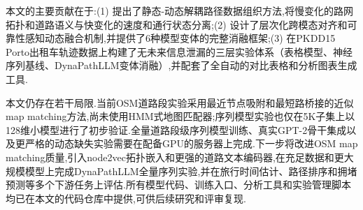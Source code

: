 \documentclass{rjthesis}
\begin{document}
本文的主要贡献在于:(1) 提出了静态-动态解耦路径数据组织方法,将慢变化的路网拓扑和道路语义与快变化的速度和通行状态分离;(2) 设计了层次化跨模态对齐和可靠性感知动态融合机制,并提供了6种模型变体的完整消融框架;(3) 在PKDD15 Porto出租车轨迹数据上构建了无未来信息泄漏的三层实验体系（表格模型、神经序列基线、DynaPathLLM变体消融）,并配套了全自动的对比表格和分析图表生成工具.

本文仍存在若干局限.当前OSM道路段实验采用最近节点吸附和最短路桥接的近似map matching方法,尚未使用HMM式地图匹配器;序列模型实验也仅在5K子集上以128维小模型进行了初步验证.全量道路段级序列模型训练、真实GPT-2骨干集成以及更严格的动态缺失实验需要在配备GPU的服务器上完成.下一步将改进OSM map matching质量,引入node2vec拓扑嵌入和更强的道路文本编码器,在充足数据和更大规模模型上完成DynaPathLLM全量序列实验,并在旅行时间估计、路径排序和拥堵预测等多个下游任务上评估.所有模型代码、训练入口、分析工具和实验管理脚本均已在本文的代码仓库中提供,可供后续研究和评审复现.

\printbibliography[
	heading=rjrefs,
	title={\textbf{References}}
]

\rjappendixinfo
\end{document}
